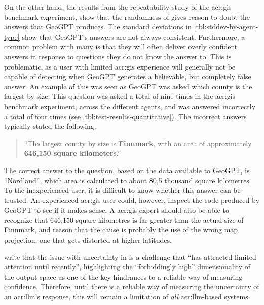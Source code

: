 On the other hand, the results from the repeatability study of the \acrshort{acr:gis} benchmark experiment, show that the randomness of  gives reason to doubt the answers that GeoGPT produces. The standard deviations in \autoref{tbl:stddev-by-agent-type} show that GeoGPT's answers are not always consistent. Furthermore, a common problem with many  is that they will often deliver overly confident answers in response to questions they do not know the answer to. This is problematic, as a user with limited \acrshort{acr:gis} experience will generally not be capable of detecting when GeoGPT generates a believable, but completely false answer. An example of this was seen as GeoGPT was asked which county is the largest by size. This question was asked a total of nine times in the \acrshort{acr:gis} benchmark experiment, across the different agents, and was answered incorrectly a total of four times (see \autoref{tbl:test-results-quantitative}). The incorrect answers typically stated the following:

\begin{quote}
    \enquote{The largest county by size is \textbf{Finnmark}, with an area of approximately \textbf{646,150 square kilometers}.}
\end{quote}

The correct answer to the question, based on the data available to GeoGPT, is \enquote{Nordland}, which area is calculated to about 80,5 thousand square kilometres. To the inexperienced user, it is difficult to know whether this answer can be trusted. An experienced \acrshort{acr:gis} user could, however, inspect the code produced by GeoGPT to see if it makes sense. A \acrshort{acr:gis} expert should also be able to recognize that 646,150 square kilometres is far greater than the actual size of Finnmark, and reason that the cause is probably the use of the wrong map projection, one that gets distorted at higher latitudes.

\cite[1-2]{linGeneratingConfidenceUncertainty2023} write that the issue with uncertainty in  is a challenge that \enquote{has attracted limited attention until recently}, highlighting the \enquote{forbiddingly high} dimensionality of the output space as one of the key hindrances to a reliable way of measuring confidence. Therefore, until there is a reliable way of measuring the uncertainty of an \acrshort{acr:llm}'s response, this will remain a limitation of \textit{all} \acrshort{acr:llm}-based systems.


